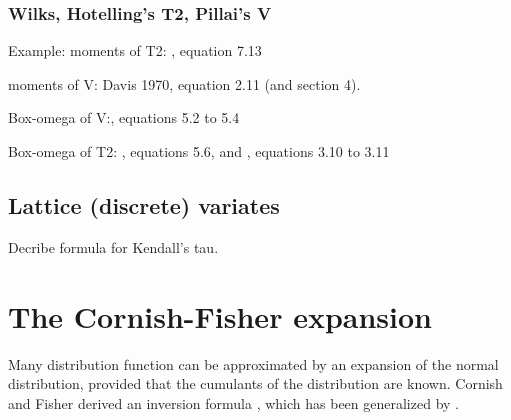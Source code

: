 \subsubsection{Wilks, Hotelling's T2, Pillai's V}


Example: moments of T2: \cite{Davis_1968} , equation 7.13

moments of V:  \cite{Davis_1970a} Davis 1970, equation 2.11 (and section 4).

Box-omega of V:\cite{Davis_1970a}, equations 5.2 to 5.4 

Box-omega of T2: \cite{Davis_1970a}, equations 5.6, and \cite{Davis_1970b}, equations 3.10 to 3.11



\subsection{Lattice (discrete) variates}




Decribe formula for Kendall's tau.

\newpage
\section{The Cornish-Fisher expansion}

Many distribution function can be approximated by an expansion of the normal distribution, provided that the cumulants of the distribution are known. Cornish and Fisher derived an inversion formula \citep{fisher_percentile_1960}, which has been generalized by \cite{Lee_1992}.



